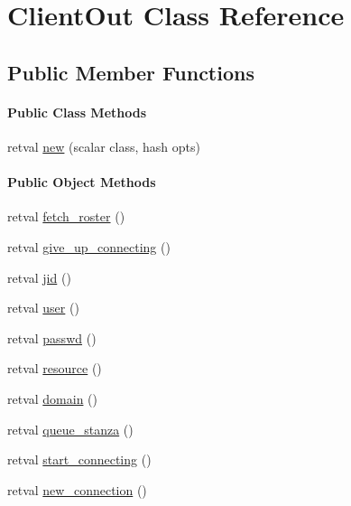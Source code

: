 \hypertarget{class_d_jabberd_1_1_queue_1_1_client_out}{
\section{\-Client\-Out \-Class \-Reference}
\label{class_d_jabberd_1_1_queue_1_1_client_out}
}
\subsection*{\-Public \-Member \-Functions}
\begin{Indent}\paragraph*{\-Public \-Class \-Methods}
\begin{DoxyCompactItemize}
\item 
retval \hyperlink{class_d_jabberd_1_1_queue_1_1_client_out_ab3e914f1f26e24c3e13639a61904af46}{new} (scalar class, hash opts)
\end{DoxyCompactItemize}
\end{Indent}
\begin{Indent}\paragraph*{\-Public \-Object \-Methods}
\begin{DoxyCompactItemize}
\item 
retval \hyperlink{class_d_jabberd_1_1_queue_1_1_client_out_a14e4a4ab6d9d0d7975831dd56d2d999a}{fetch\-\_\-roster} ()
\item 
retval \hyperlink{class_d_jabberd_1_1_queue_1_1_client_out_a8a37bda15c66bc546f4a64d130a23110}{give\-\_\-up\-\_\-connecting} ()
\item 
retval \hyperlink{class_d_jabberd_1_1_queue_1_1_client_out_a83e1c03279960e7e1e0558037620699c}{jid} ()
\item 
retval \hyperlink{class_d_jabberd_1_1_queue_1_1_client_out_aa8528ad02f86850f27c9fc5a9e6900d2}{user} ()
\item 
retval \hyperlink{class_d_jabberd_1_1_queue_1_1_client_out_a883b82301d1024a33da44d8b5a32eb61}{passwd} ()
\item 
retval \hyperlink{class_d_jabberd_1_1_queue_1_1_client_out_a98660589881e26d56ca52fdad2c7c29c}{resource} ()
\item 
retval \hyperlink{class_d_jabberd_1_1_queue_1_1_client_out_a4c93b98245a3bd6851bd6935fe94841b}{domain} ()
\item 
retval \hyperlink{class_d_jabberd_1_1_queue_1_1_client_out_a0cd4d399794955bfaab24b954ed14457}{queue\-\_\-stanza} ()
\item 
retval \hyperlink{class_d_jabberd_1_1_queue_1_1_client_out_abfc1812bd58bc72b7c54b787f8d95948}{start\-\_\-connecting} ()
\item 
retval \hyperlink{class_d_jabberd_1_1_queue_1_1_client_out_a7e066b0aea2f81bc8b2a400d38f60ce0}{new\-\_\-connection} ()
\end{DoxyCompactItemize}
\end{Indent}


